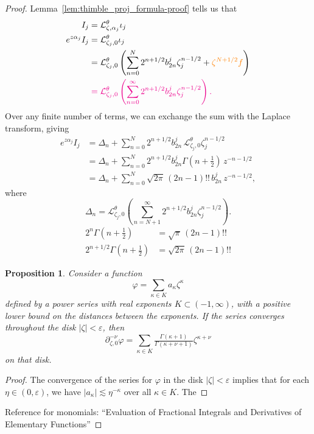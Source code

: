 \documentclass{article}
\newcommand{\laplace}{\mathcal{L}}
\theoremstyle{definition}
\theoremstyle{plain}
\newtheorem{prop}[definition]{Proposition}
\newenvironment{verify}{\color{ForestGreen}}{\color{black}}
\newenvironment{old}{\color{RoyalBlue}}{\color{black}}
\begin{document}
\begin{proof}
\begin{old}
Lemma~\ref{lem:thimble_proj_formula-proof} tells us that
\begin{align*}
I_j & = \laplace_{\zeta, \alpha_j}^\theta \iota_j \\
e^{z\alpha_j} I_j & = \laplace_{\zeta_j, 0}^\theta \iota_j \\
& = \laplace_{\zeta_j, 0}^\theta \left( \sum_{n = 0}^N 2^{n+1/2} b_{2n}^j \zeta_j^{n - 1/2} + \textcolor{orange}{\zeta^{N+1/2} f}\right) \\
& \color{magenta} = \laplace_{\zeta_j, 0}^\theta \left( \sum_{n = 0}^\infty 2^{n+1/2} b_{2n}^j \zeta_j^{n - 1/2} \right).
\end{align*}
Over any finite number of terms, we can exchange the sum with the Laplace transform, giving
\begin{align*}
e^{z\alpha_j} I_j & = \Delta_n + \sum_{n = 0}^N 2^{n+1/2} b_{2n}^j\,\laplace_{\zeta_j, 0}^\theta \zeta_j^{n - 1/2} \\
& = \Delta_n + \sum_{n = 0}^N 2^{n+1/2} b_{2n}^j \Gamma(n + \tfrac{1}{2})\,z^{-n - 1/2} \\
& = \Delta_n + \sum_{n = 0}^N \sqrt{2\pi}\,(2n - 1)!!\,b_{2n}^j\,z^{-n - 1/2},
\end{align*}
where
\[ \Delta_n = \laplace_{\zeta_j, 0}^\theta \left( \sum_{n = N+1}^\infty 2^{n+1/2} b_{2n}^j \zeta_j^{n - 1/2} \right). \]
\begin{verify}
\begin{align*}
2^n \Gamma(n + \tfrac{1}{2}) & = \sqrt{\pi}\,(2n - 1)!! \\
2^{n + 1/2} \Gamma(n + \tfrac{1}{2}) & = \sqrt{2\pi}\,(2n - 1)!!
\end{align*}
\end{verify}

\begin{prop}
Consider a function
\[ \varphi = \sum_{\kappa \in K} a_\kappa \zeta^\kappa \]
defined by a power series with real exponents $K \subset (-1, \infty)$, with a positive lower bound on the distances between the exponents. If the series converges throughout the disk $|\zeta| < \varepsilon$, then
\[ \partial_{\zeta, 0}^{-\nu} \varphi = \sum_{\kappa \in K} \tfrac{\Gamma(\kappa+1)}{\Gamma(\kappa+\nu+1)} \zeta^{\kappa + \nu} \]
on that disk.
\end{prop}
\begin{proof}
The convergence of the series for $\varphi$ in the disk $|\zeta| < \varepsilon$ implies that for each $\eta \in (0, \varepsilon)$, we have $|a_\kappa| \lesssim \eta^{-\kappa}$ over all $\kappa \in K$. The
\end{proof}
\begin{verify}
Reference for monomials: ``Evaluation of Fractional Integrals and Derivatives of Elementary Functions''


\end{verify}
\end{old}
\end{proof}
\end{document}
